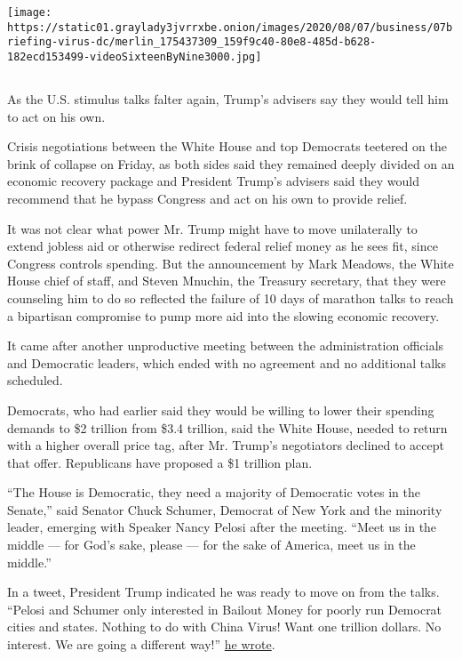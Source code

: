 \texttt{[image: https://static01.graylady3jvrrxbe.onion/images/2020/08/07/business/07briefing-virus-dc/merlin\_175437309\_159f9c40-80e8-485d-b628-182ecd153499-videoSixteenByNine3000.jpg]}

\hypertarget{section}{%
\subsection{}\label{section}}

As the U.S. stimulus talks falter again, Trump's advisers say they would
tell him to act on his own.

Crisis negotiations between the White House and top Democrats teetered
on the brink of collapse on Friday, as both sides said they remained
deeply divided on an economic recovery package and President Trump's
advisers said they would recommend that he bypass Congress and act on
his own to provide relief.

It was not clear what power Mr. Trump might have to move unilaterally to
extend jobless aid or otherwise redirect federal relief money as he sees
fit, since Congress controls spending. But the announcement by Mark
Meadows, the White House chief of staff, and Steven Mnuchin, the
Treasury secretary, that they were counseling him to do so reflected the
failure of 10 days of marathon talks to reach a bipartisan compromise to
pump more aid into the slowing economic recovery.

It came after another unproductive meeting between the administration
officials and Democratic leaders, which ended with no agreement and no
additional talks scheduled.

Democrats, who had earlier said they would be willing to lower their
spending demands to \$2 trillion from \$3.4 trillion, said the White
House, needed to return with a higher overall price tag, after Mr.
Trump's negotiators declined to accept that offer. Republicans have
proposed a \$1 trillion plan.

``The House is Democratic, they need a majority of Democratic votes in
the Senate,'' said Senator Chuck Schumer, Democrat of New York and the
minority leader, emerging with Speaker Nancy Pelosi after the meeting.
``Meet us in the middle --- for God's sake, please --- for the sake of
America, meet us in the middle.''

In a tweet, President Trump indicated he was ready to move on from the
talks. ``Pelosi and Schumer only interested in Bailout Money for poorly
run Democrat cities and states. Nothing to do with China Virus! Want one
trillion dollars. No interest. We are going a different way!''
\href{https://twitter.com/realDonaldTrump/status/1291842540023558146?s=20}{he
wrote}.

